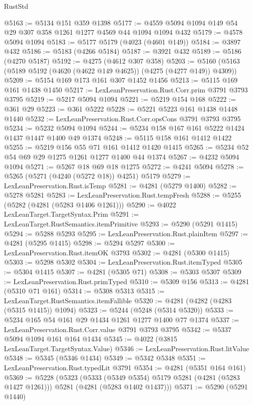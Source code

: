\begin{lexlean}{RustStd}
\begin{coremodule}
@5163 := @5134 @151 @359 @1398
@5177 := @4559 @5094 @1094 @149 @54 @29 @307 @358 @1261 @1277 @4569 @44 @1094 @1094 @432
@5179 := @4578 @5094 @1094
@5183 := @5177 @5179 (@4023 (@4601 @149))
@5184 := @3897 @432
@5186 := @5183 (@4266 @5184)
@5187 := @3921 @432
@5189 := @5186 (@4270 @5187)
@5192 := @4275 (@4612 @307 @358)
@5203 := @5160 (@5163 (@5189 @5192 (@4620 (@4622 @149 @4625)) (@4275 (@4277 @149)) @4309))
@5209 := @5154 @169 @173 @161 @307 @1452 @1456
@5213 := @5115 @169 @161 @1438 @1450
@5217 := LexLeanPreservation.Rust.Corr.prim @3791 @3793 @3795
@5219 := @5217 @5094 @1094
@5221 := @5219 @154 @168
@5222 := @361 @29
@5223 := @361 @5222
@5228 := @5221 @5223 @161 @1438 @1448 @1440
@5232 := LexLeanPreservation.Rust.Corr.opsCons @3791 @3793 @3795
@5234 := @5232 @5094 @1094
@5244 := @5234 @158 @167 @161 @5222 @1424 @1437 @1447 @1400 @49 @1374
@5248 := @5115 @158 @161 @1412 @1422
@5255 := @5219 @156 @55 @71 @161 @1412 @1420 @1415
@5265 := @5234 @52 @54 @69 @29 @1275 @1261 @1277 @1400 @44 @1374
@5267 := @4232 @5094 @1094
@5271 := @5267 @18 @69 @18 @1275
@5272 := @4241 @5094
@5278 := @5265 (@5271 (@4240 (@5272 @18)) @4251) @5179
@5279 := LexLeanPreservation.Rust.isTemp
@5281 := @4281 (@5279 @1400)
@5282 := @5278 @5281
@5283 := LexLeanPreservation.Rust.tempFresh
@5288 := @5255 (@5282 (@4281 (@5283 @1406 @1261)))
@5290 := @4022 LexLeanTarget.TargetSyntax.Prim
@5291 := LexLeanTarget.RustSemantics.itemPrimitive
@5293 := @5290 (@5291 @1415)
@5294 := @5288 @5293
@5295 := LexLeanPreservation.Rust.plainItem
@5297 := @4281 (@5295 @1415)
@5298 := @5294 @5297
@5300 := LexLeanPreservation.Rust.itemOK @3793
@5302 := @4281 (@5300 @1415)
@5303 := @5298 @5302
@5304 := LexLeanPreservation.Rust.itemTyped
@5305 := @5304 @1415
@5307 := @4281 (@5305 @71)
@5308 := @5303 @5307
@5309 := LexLeanPreservation.Rust.primTyped
@5310 := @5309 @156
@5313 := @4281 (@5310 @71 @161)
@5314 := @5308 @5313
@5315 := LexLeanTarget.RustSemantics.itemFallible
@5320 := @4281 (@4282 (@4283 (@5315 @1415)) @1094)
@5323 := @5244 (@5248 (@5314 @5320))
@5333 := @5234 @165 @54 @161 @29 @1434 @1261 @1277 @1400 @77 @1374
@5337 := LexLeanPreservation.Rust.Corr.value @3791 @3793 @3795
@5342 := @5337 @5094 @1094 @161 @164 @1434
@5345 := @4022 (@3815 LexLeanTarget.TargetSyntax.Value)
@5346 := LexLeanPreservation.Rust.litValue
@5348 := @5345 (@5346 @1434)
@5349 := @5342 @5348
@5351 := LexLeanPreservation.Rust.typedLit @3791
@5354 := @4281 (@5351 @164 @161)
@5369 := @5228
    (@5323
      (@5333 (@5349 @5354) @5179 @5281 (@4281 (@5283 @1427 @1261)))
      @5281
      (@4281 (@5283 @1402 @1437)))
@5371 := @5290 (@5291 @1440)

\end{coremodule}
\end{lexlean}
